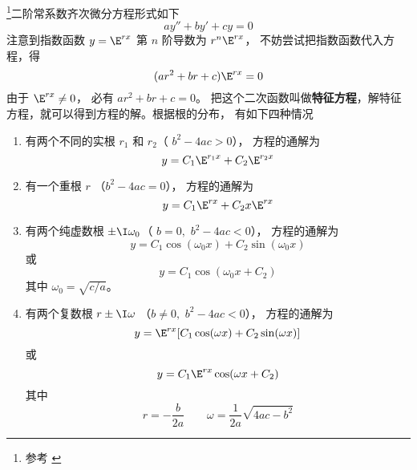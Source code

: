 

\begin{issues}
\end{issues}

\footnote{参考 \cite{同济高}}二阶常系数齐次微分方程形式如下
\begin{equation}
ay'' + by' + cy = 0
\end{equation}
注意到指数函数 $y = \E^{rx}$ 第 $n$ 阶导数为 $r^n \E^{rx}$， 不妨尝试把指数函数代入方程，得
\begin{equation}
(a r^2 + br + c) \E^{rx} = 0
\end{equation}
由于 $\E^{rx} \ne 0$， 必有 $a r^2 + br + c = 0$。 把这个二次函数叫做\textbf{特征方程}，解特征方程，就可以得到方程的解。根据根的分布， 有如下四种情况

\begin{enumerate}
\item 有两个不同的实根 $r_1$ 和  $r_2$（ $b^2 - 4ac > 0$）， 方程的通解为
\begin{equation}
y = C_1 \E^{r_1 x} + C_2 \E^{r_2 x}
\end{equation}
\item 有一个重根 $r$ （$b^2 - 4ac = 0$）， 方程的通解为
\begin{equation}\label{Ode2_eq4}
y = C_1 \E^{rx} + C_2 x \E^{rx}
\end{equation}
\item 有两个纯虚数根 $\pm \I \omega_0$（ $b = 0,\,\, b^2 - 4ac < 0$）， 方程的通解为
\begin{equation}
y = C_1\cos(\omega_0 x) + C_2 \sin(\omega_0 x)
\end{equation}
或 
\begin{equation}
y = C_1\cos(\omega_0 x + C_2)
\end{equation} 
其中 $\omega_0 = \sqrt{c/a}$。 

\item 有两个复数根 $r \pm \I\omega$ （$b \ne 0,\,\, b^2 - 4ac < 0$）， 方程的通解为
\begin{equation}\label{Ode2_eq7}
y = \E^{rx} [ C_1\cos(\omega x) + C_2\sin(\omega x) ]
\end{equation} 
或 
\begin{equation}
y = C_1\E^{rx}\cos(\omega x + C_2)
\end{equation} 
其中
\begin{equation}
r =  - \frac{b}{2a} \qquad \omega  = \frac{1}{2a}\sqrt{4ac - b^2} 
\end{equation}

\end{enumerate}

